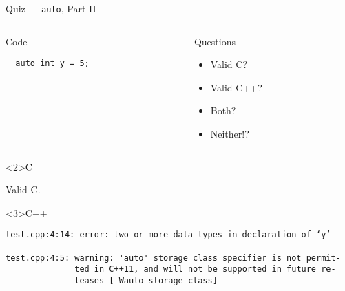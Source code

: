 \documentclass[presentation,aspectratio=169]{beamer}
\begin{document}
\begin{frame}[fragile,label={sec:org23c4234}]{Quiz — \texttt{auto}, Part II}
\begin{columns}
\begin{column}{0.48\columnwidth}
\begin{block}{Code}
\begin{verbatim}
  auto int y = 5;
\end{verbatim}
\end{block}
\end{column}

\begin{column}{0.48\columnwidth}
\begin{block}{Questions}
\begin{itemize}
\item Valid C?
\item Valid C++?
\item Both?
\item Neither!?
\end{itemize}
\end{block}
\end{column}
\end{columns}

\begin{block}<2>{C}

Valid C.

\end{block}
\vspace{-1cm}
\begin{block}<3>{C++}
\begin{verbatim}
test.cpp:4:14: error: two or more data types in declaration of ‘y’

test.cpp:4:5: warning: 'auto' storage class specifier is not permit-
              ted in C++11, and will not be supported in future re-
              leases [-Wauto-storage-class]
\end{verbatim}
\end{block}
\end{frame}

\end{document}
